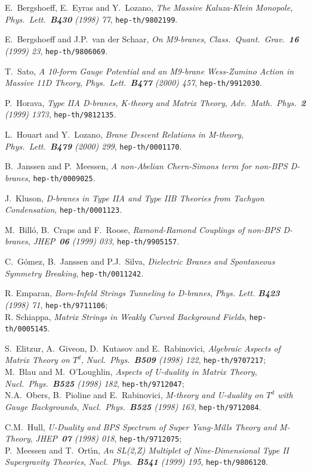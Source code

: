 \documentclass[12pt,a4paper]{article}
\begin{document}
\begin{thebibliography}{99}
E.~Bergshoeff, E.~Eyras and Y.~Lozano, {\sl The Massive 
Kaluza-Klein Monopole}, {\it Phys.~Lett.~{\bf B430} (1998) 77},
{\tt hep-th/9802199}.

E.~Bergshoeff and J.P.~van der Schaar, {\sl On M9-branes},
{\it Class.~Quant.~Grav.~{\bf 16} (1999) 23},
{\tt hep-th/9806069}.

T.~Sato, {\sl A 10-form Gauge Potential and an M9-brane Wess-Zumino
Action in Massive 11D Theory}, {\it Phys.~Lett.~{\bf B477} (2000) 457},
{\tt hep-th/9912030}.

P.~Horava, {\sl Type IIA D-branes, K-theory and Matrix Theory},
{\it Adv.~Math.~Phys.~{\bf 2} (1999) 1373}, {\tt hep-th/9812135}.

L.~Houart and Y.~Lozano, {\sl Brane Descent Relations in M-theory},
{\it Phys.~Lett.~{\bf B479} (2000) 299}, {\tt hep-th/0001170}.

B.~Janssen and P.~Meessen, {\sl A non-Abelian Chern-Simons term for 
non-BPS D-branes}, {\tt hep-th/0009025}.

J.~Kluson, {\sl D-branes in Type IIA and Type IIB Theories from
Tachyon Condensation}, {\tt hep-th/0001123}.

M.~Bill\'o, B.~Craps and F.~Roose, {\sl Ramond-Ramond Couplings
of non-BPS D-branes}, {\it JHEP~{\bf 06} (1999)
033}, {\tt hep-th/9905157}.

C.~G\'omez, B.~Janssen and P.J.~Silva, {\sl Dielectric Branes and
Spontaneous Symmetry Breaking}, {\tt hep-th/0011242}.

R. Emparan, {\sl Born-Infeld Strings Tunneling to D-branes},
{\it Phys. Lett. {\bf B423} (1998) 71}, {\tt hep-th/9711106};\\
R. Schiappa, {\sl Matrix Strings in Weakly Curved Background Fields},
{\tt hep-th/0005145}.

S.~Elitzur, A.~Giveon, D.~Kutasov and E.~Rabinovici, {\sl Algebraic
Aspects of Matrix Theory on $T^d$}, {\it Nucl.~Phys.~{\bf B509}
(1998) 122}, {\tt hep-th/9707217};\\
M.~Blau and M.~O'Loughlin, {\sl Aspects of U-duality in Matrix Theory},
{\it Nucl.~Phys.~{\bf B525} (1998) 182}, {\tt hep-th/9712047};\\
N.A.~Obers, B.~Pioline and E.~Rabinovici, {\sl M-theory and U-duality
on $T^d$ with Gauge Backgrounds}, {\it Nucl.~Phys.~{\bf B525} (1998)
163}, {\tt hep-th/9712084}.

C.M.~Hull, {\sl U-Duality and BPS Spectrum of Super Yang-Mills
Theory and M-Theory}, {\it JHEP~{\bf 07} (1998) 018},
{\tt hep-th/9712075};\\
P.~Meessen and T.~Ort\'{\i}n, {\sl An SL(2,Z) Multiplet of Nine-Dimensional
Type II Supergravity Theories}, {\it Nucl.~Phys.~{\bf B541} (1999) 195},
{\tt hep-th/9806120}.


\end{thebibliography}
\end{document}
